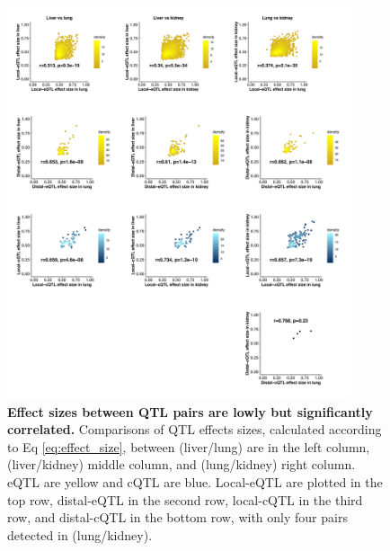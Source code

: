 \documentclass[9pt,twocolumn,twoside]{gsajnl}
\begin{document}
\begin{figure}[hp]
\renewcommand{\familydefault}{\sfdefault}\normalfont
\centering
\includegraphics[width=0.9\textwidth, trim={0in 0in 0in 0in}, clip]{figs/effect_size_by_effect_size.pdf}
\caption{\textbf{Effect sizes between QTL pairs are lowly but significantly correlated.} Comparisons of QTL effects sizes, calculated according to Eq \ref{eq:effect_size}, between (liver/lung) are in the left column, (liver/kidney) middle column, and (lung/kidney) right column. eQTL are yellow and cQTL are blue. Local-eQTL are plotted in the top row, distal-eQTL in the second row, local-cQTL in the third row, and distal-cQTL in the bottom row, with only four pairs detected in (lung/kidney). 
\label{fig:qtl_effect_size_comparison}}
\end{figure}
\end{document}

